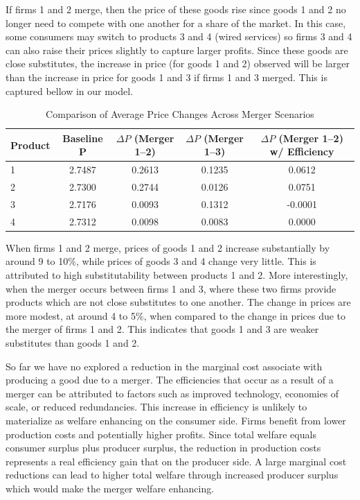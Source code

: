 \documentclass[12pt]{article}
\begin{document}
If firms 1 and 2 merge, then the price of these goods rise since goods 1 and 2 no longer need to compete with one another for a share of the market. In this case, some consumers may switch to products 3 and 4 (wired services) so firms 3 and 4 can also raise their prices slightly to capture larger profits. Since these goods are close substitutes, the increase in price (for goods 1 and 2) observed will be larger than the increase in price for goods 1 and 3 if firms 1 and 3 merged. This is captured bellow in our model. 

\begin{table}[h!]
\centering
\caption{Comparison of Average Price Changes Across Merger Scenarios}
\begin{tabular}{lcccc}
\hline
Product & Baseline P & $\Delta P$ (Merger 1--2) & $\Delta P$ (Merger 1--3) & $\Delta P$ (Merger 1--2) w/ Efficiency\\
\hline
1 & 2.7487 & 0.2613 & 0.1235 & 0.0612 \\
2 & 2.7300 & 0.2744 & 0.0126 & 0.0751 \\
3 & 2.7176 & 0.0093 & 0.1312 & -0.0001 \\
4 & 2.7312 & 0.0098 & 0.0083 & 0.0000 \\
\hline
\end{tabular}
\end{table}

When firms 1 and 2 merge, prices of goods 1 and 2 increase substantially by around 9 to 10\%, while prices of goods 3 and 4 change very little. This is attributed to high substitutability between products 1 and 2. More interestingly, when the merger occurs between firms 1 and 3, where these two firms provide products which are not close substitutes to one another. The change in prices are more modest, at around 4 to 5\%, when compared to the change in prices due to the merger of firms 1 and 2. This indicates that goods 1 and 3 are weaker substitutes than goods 1 and 2.

So far we have no explored a reduction in the marginal cost associate with producing a good due to a merger. The efficiencies that occur as a result of a merger can be attributed to factors such as improved technology, economies of scale, or reduced redundancies. This increase in efficiency is unlikely to materialize as welfare enhancing on the consumer side. Firms benefit from lower production costs and potentially higher profits. Since total welfare equals consumer surplus plus producer surplus, the reduction in production costs represents a real efficiency gain that on the producer side. A large marginal cost reductions can lead to higher total welfare through increased producer surplus which would make the merger welfare enhancing.
\end{document}
